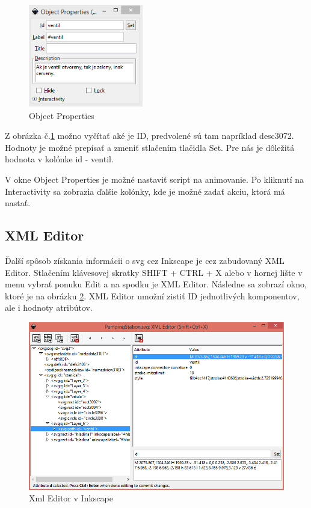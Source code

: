 \begin{figure}[H]
	\begin{center}
		\includegraphics [width=5cm]  {obrazky/obr3.png}
		\caption{Object Properties}
		\label{picture3}
	\end{center}
\end{figure}


Z obrázka č.\ref{picture3} možno vyčítať aké je ID, predvolené sú tam napríklad desc3072. Hodnoty je možné prepísať a zmeniť stlačením tlačidla Set. Pre nás je dôležitá hodnota v kolónke id - ventil. 

V okne Object Properties je možné nastaviť script na animovanie. Po kliknutí na Interactivity sa zobrazia ďalšie kolónky, kde je možné zadať akciu, ktorá má nastať.  


\subsection{XML Editor}
Ďalší spôsob získania informácii o svg cez Inkscape je cez zabudovaný XML Editor.
Stlačením klávesovej skratky SHIFT + CTRL + X alebo v hornej lište v menu vybrať ponuku Edit a na spodku je XML Editor. Následne sa zobrazí okno, ktoré je na obrázku \ref{xmlEditor}. XML Editor umožní zistiť ID jednotlivých komponentov, ale i hodnoty atribútov. 

\begin{figure}[H]
	\begin{center}
		\includegraphics[width=0.6\linewidth]  {obrazky/XmlEditor2.png}
		\caption{Xml Editor v Inkscape}
		\label{xmlEditor}
	\end{center}
\end{figure}



